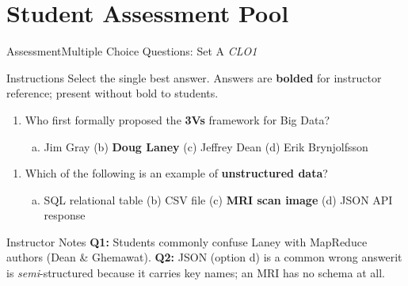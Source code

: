 \documentclass[aspectratio=169,10pt]{beamer}
\begin{document}
\section{Student Assessment Pool}

\begin{frame}{Assessment\textemdash Multiple Choice Questions: Set A \hfill\small\textit{CLO1}}
  \begin{exampleblock}{Instructions}
    Select the single best answer.  Answers are \textbf{bolded} for instructor reference; present without bold to students.
  \end{exampleblock}
  \vspace{8pt}
  \begin{enumerate}[\textbf{Q1.}]
    \item Who first formally proposed the \textbf{3Vs} framework for Big Data?
    \begin{enumerate}[(a)]
      \item Jim Gray \quad
      (b) \textbf{Doug Laney} \quad
      (c) Jeffrey Dean \quad
      (d) Erik Brynjolfsson
    \end{enumerate}
  \end{enumerate}
  \vspace{6pt}
  \begin{enumerate}[\textbf{Q2.}]
    \item Which of the following is an example of \textbf{unstructured data}?
    \begin{enumerate}[(a)]
      \item SQL relational table \quad
      (b) CSV file \quad
      (c) \textbf{MRI scan image} \quad
      (d) JSON API response
    \end{enumerate}
  \end{enumerate}
  \vspace{10pt}
  \begin{alertblock}{Instructor Notes}
    \textbf{Q1:} Students commonly confuse Laney with MapReduce authors (Dean \& Ghemawat).  \textbf{Q2:} JSON (option d) is a common wrong answer\textemdash it is \emph{semi}-structured because it carries key names; an MRI has no schema at all.
  \end{alertblock}
\end{frame}
\end{document}
